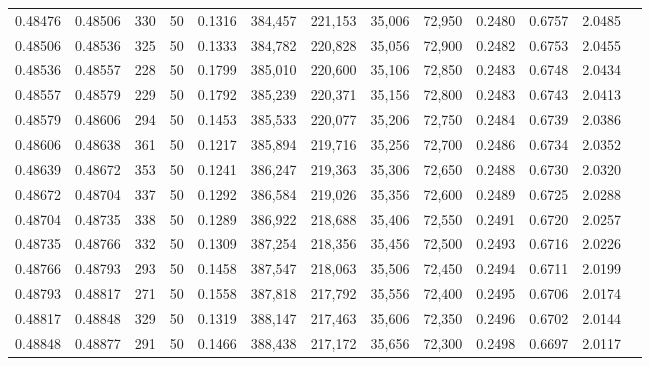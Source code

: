 \begin{tabular}{rrrrrrrrrrrrr}
0.48476 & 0.48506 &   330 &  50 &                                     0.1316 & 384,457 & 221,153 &  35,006 &  72,950 & 0.2480 & 0.6757 & 2.0485 \\
0.48506 & 0.48536 &   325 &  50 &                                     0.1333 & 384,782 & 220,828 &  35,056 &  72,900 & 0.2482 & 0.6753 & 2.0455 \\
0.48536 & 0.48557 &   228 &  50 &                                     0.1799 & 385,010 & 220,600 &  35,106 &  72,850 & 0.2483 & 0.6748 & 2.0434 \\
0.48557 & 0.48579 &   229 &  50 &                                     0.1792 & 385,239 & 220,371 &  35,156 &  72,800 & 0.2483 & 0.6743 & 2.0413 \\
0.48579 & 0.48606 &   294 &  50 &                                     0.1453 & 385,533 & 220,077 &  35,206 &  72,750 & 0.2484 & 0.6739 & 2.0386 \\
0.48606 & 0.48638 &   361 &  50 &                                     0.1217 & 385,894 & 219,716 &  35,256 &  72,700 & 0.2486 & 0.6734 & 2.0352 \\
0.48639 & 0.48672 &   353 &  50 &                                     0.1241 & 386,247 & 219,363 &  35,306 &  72,650 & 0.2488 & 0.6730 & 2.0320 \\
0.48672 & 0.48704 &   337 &  50 &                                     0.1292 & 386,584 & 219,026 &  35,356 &  72,600 & 0.2489 & 0.6725 & 2.0288 \\
0.48704 & 0.48735 &   338 &  50 &                                     0.1289 & 386,922 & 218,688 &  35,406 &  72,550 & 0.2491 & 0.6720 & 2.0257 \\
0.48735 & 0.48766 &   332 &  50 &                                     0.1309 & 387,254 & 218,356 &  35,456 &  72,500 & 0.2493 & 0.6716 & 2.0226 \\
0.48766 & 0.48793 &   293 &  50 &                                     0.1458 & 387,547 & 218,063 &  35,506 &  72,450 & 0.2494 & 0.6711 & 2.0199 \\
0.48793 & 0.48817 &   271 &  50 &                                     0.1558 & 387,818 & 217,792 &  35,556 &  72,400 & 0.2495 & 0.6706 & 2.0174 \\
0.48817 & 0.48848 &   329 &  50 &                                     0.1319 & 388,147 & 217,463 &  35,606 &  72,350 & 0.2496 & 0.6702 & 2.0144 \\
0.48848 & 0.48877 &   291 &  50 &                                     0.1466 & 388,438 & 217,172 &  35,656 &  72,300 & 0.2498 & 0.6697 & 2.0117 \\

\end{tabular}
